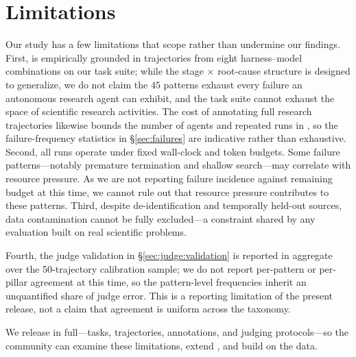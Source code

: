 \section{Limitations}
\label{sec:limitations}
Our study has a few limitations that scope rather than undermine our
findings.
First, \taxonomy is empirically grounded in trajectories from eight
harness--model combinations on our task suite; while the stage $\times$
root-cause structure is designed to generalize, we do not claim the $45$
patterns exhaust every failure an autonomous research agent can exhibit,
and the task suite cannot exhaust the space of scientific research
activities. The cost of annotating full research trajectories likewise
bounds the number of agents and repeated runs in \bench, so the
failure-frequency statistics in \S\ref{sec:failures} are indicative rather than exhaustive.
Second, all runs operate under fixed wall-clock and token budgets. Some
failure patterns---notably premature termination and shallow search---may
correlate with resource pressure. As we are not reporting failure incidence against remaining budget at this time, we cannot rule out that resource pressure contributes to these patterns.
Third, despite de-identification and temporally held-out sources, data
contamination cannot be fully excluded---a constraint shared by any
evaluation built on real scientific problems.


Fourth, the judge validation in \S\ref{sec:judge:validation} is reported in aggregate over the 50-trajectory calibration sample; we do not report per-pattern or per-pillar agreement at this time, so the pattern-level frequencies inherit an unquantified share of judge error. This is a reporting limitation of the present release, not a claim that agreement is uniform across the taxonomy.

We release \bench in full---tasks, trajectories, annotations, and
judging protocols---so the community can examine these limitations, extend
\taxonomy, and build on the data.